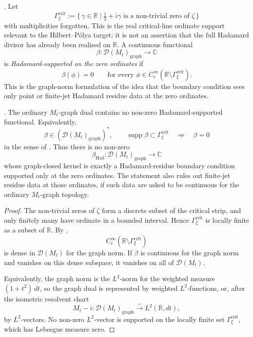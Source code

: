 \begin{definition}
\label{v4-arith:w9-r4:def:hadamard-supported-graph-functional}
\ClaimStatusDefinitional. Let
\[
\Gamma_{\xi}^{\mathrm{crit}}:=\{\,\gamma\in\mathbb R\mid
\tfrac12+i\gamma\text{ is a non-trivial zero of }\zeta\,\}
\]
with multiplicities forgotten. This is the real critical-line
ordinate support relevant to the Hilbert--P\'olya target; it is not an
assertion that the full Hadamard divisor has already been realised on
\(\mathbb R\). A continuous functional
\[
\beta\colon \mathcal{D}(M_t)_{\mathrm{graph}}\longrightarrow\mathbb C
\]
is \emph{Hadamard-supported on the zero ordinates} if
\[
\beta(\phi)=0
\qquad
\text{for every }
\phi\in C_c^\infty(\mathbb R\setminus\Gamma_{\xi}^{\mathrm{crit}}).
\]
This is the graph-norm formulation of the idea that the boundary
condition sees only point or finite-jet Hadamard residue data at the
zero ordinates.
\end{definition}

\begin{theorem}
\label{v4-arith:w9-r4:thm:no-hadamard-graph-dual}
\ClaimStatusProvedHere. The ordinary \(M_t\)-graph dual contains no
non-zero Hadamard-supported functional. Equivalently,
\[
\beta\in(\mathcal{D}(M_t)_{\mathrm{graph}})^{*},
\qquad
\operatorname{supp}\beta\subset\Gamma_{\xi}^{\mathrm{crit}}
\quad\Longrightarrow\quad
\beta=0
\]
in the sense of
.
Thus there is no non-zero
\[
\beta_{\mathrm{Had}}\colon \mathcal{D}(M_t)_{\mathrm{graph}}\to\mathbb C
\]
whose graph-closed kernel is exactly a Hadamard-residue boundary
condition supported only at the zero ordinates. The statement also
rules out finite-jet residue data at those ordinates, if such data are
asked to be continuous for the ordinary \(M_t\)-graph topology.
\end{theorem}

\begin{proof}
The non-trivial zeros of \(\zeta\) form a discrete subset of the
critical strip, and only finitely many have ordinate in a bounded
interval. Hence \(\Gamma_{\xi}^{\mathrm{crit}}\) is locally finite as a subset of
\(\mathbb R\). By
,
\[
C_c^\infty(\mathbb R\setminus\Gamma_{\xi}^{\mathrm{crit}})
\]
is dense in \(\mathcal{D}(M_t)\) for the graph norm. If
\(\beta\) is continuous for the graph norm and vanishes on this dense
subspace, it vanishes on all of \(\mathcal{D}(M_t)\).

Equivalently, the graph norm is the \(L^2\)-norm for the weighted
measure \((1+t^2)\,dt\), so the graph dual is represented by weighted
\(L^2\)-functions, or, after the isometric resolvent chart
\[
M_t-i\colon \mathcal{D}(M_t)_{\mathrm{graph}}\xrightarrow{\sim}
L^2(\mathbb R,dt),
\]
by \(L^2\)-vectors. No non-zero \(L^2\)-vector is supported on the
locally finite set \(\Gamma_{\xi}^{\mathrm{crit}}\), which has Lebesgue measure zero.
\end{proof}

